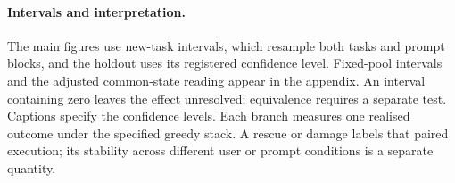 \paragraph{Intervals and interpretation.} The main figures use new-task intervals, which resample both tasks and prompt blocks, and the holdout uses its registered confidence level. Fixed-pool intervals and the adjusted common-state reading appear in the appendix. An interval containing zero leaves the effect unresolved; equivalence requires a separate test. Captions specify the confidence levels. Each branch measures one realised outcome under the specified greedy stack. A rescue or damage labels that paired execution; its stability across different user or prompt conditions is a separate quantity.
